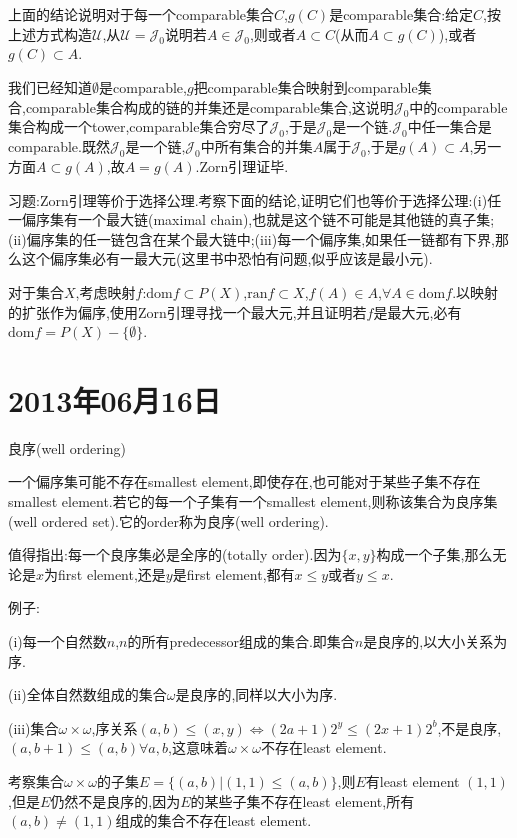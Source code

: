 \documentclass[12pt,a4paper,openany]{book}
\begin{document}
上面的结论说明对于每一个comparable集合$C$,$g(C)$是comparable集合:给定$C$,按上述方式构造$\mathscr{U}$,从$\mathscr{U}=\mathscr{J}_0$说明若$A \in \mathscr{J}_0$,则或者$A \subset C$(从而$A \subset g(C)$),或者$g(C) \subset A$.

我们已经知道$\emptyset$是comparable,$g$把comparable集合映射到comparable集合,comparable集合构成的链的并集还是comparable集合,这说明$\mathscr{J}_0$中的comparable集合构成一个tower,comparable集合穷尽了$\mathscr{J}_0$,于是$\mathscr{J}_0$是一个链.$\mathscr{J}_0$中任一集合是comparable.既然$\mathscr{J}_0$是一个链,$\mathscr{J}_0$中所有集合的并集$A$属于$\mathscr{J}_0$,于是$g(A) \subset A$,另一方面$A \subset g(A)$,故$A=g(A)$.Zorn引理证毕.

习题:Zorn引理等价于选择公理.考察下面的结论,证明它们也等价于选择公理:(i)任一偏序集有一个最大链(maximal chain),也就是这个链不可能是其他链的真子集;(ii)偏序集的任一链包含在某个最大链中;(iii)每一个偏序集,如果任一链都有下界,那么这个偏序集必有一最大元(这里书中恐怕有问题,似乎应该是最小元).

对于集合$X$,考虑映射$f$:$\text{dom}{f} \subset P(X)$,$\text{ran}{f} \subset X$,$f(A) \in A$,$\forall A \in \text{dom}{f}$.以映射的扩张作为偏序,使用Zorn引理寻找一个最大元,并且证明若$f$是最大元,必有$\text{dom}{f} = P(X)-\{\emptyset\}$.

\section{2013年06月16日}
良序(well ordering)

一个偏序集可能不存在smallest element,即使存在,也可能对于某些子集不存在smallest element.若它的每一个子集有一个smallest element,则称该集合为良序集(well ordered set).它的order称为良序(well ordering).

值得指出:每一个良序集必是全序的(totally order).因为$\{x,y\}$构成一个子集,那么无论是$x$为first element,还是$y$是first element,都有$x \le y$或者$y \le x$.

例子:

(i)每一个自然数$n$,$n$的所有predecessor组成的集合.即集合$n$是良序的,以大小关系为序.

(ii)全体自然数组成的集合$\omega$是良序的,同样以大小为序.

(iii)集合$\omega \times \omega$,序关系$(a,b) \le (x,y)$$\Leftrightarrow$$(2a+1)2^y \le (2x+1)2^b$,不是良序,$(a,b+1) \le (a,b)$$\forall a,b$,这意味着$\omega \times \omega$不存在least element.

考察集合$\omega \times \omega$的子集$E = \{(a,b) | (1,1) \le (a,b)\}$,则$E$有least element $(1,1)$,但是$E$仍然不是良序的,因为$E$的某些子集不存在least element,所有$(a,b) \neq (1,1)$组成的集合不存在least element.
\end{document}
